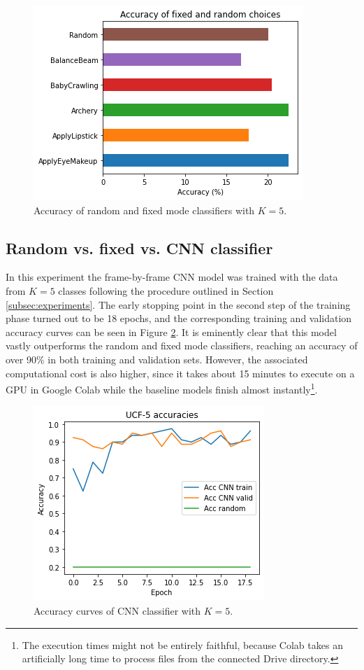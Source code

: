 \documentclass[letterpaper, 10 pt, conference]{IEEEtran}
\begin{document}
\begin{figure}[h!]
  \centering
  \includegraphics[width=.4\textwidth]{img/s1_accs}
  \vspace{-.5em}
  \caption{Accuracy of random and fixed mode classifiers with $K=5$.}
  \label{fig:comp_s1}
\end{figure}

\subsection{Random vs. fixed vs. CNN classifier}

In this experiment the frame-by-frame CNN model was trained with the data from $K=5$ classes following the procedure outlined in Section \ref{subsec:experiments}. The early stopping point in the second step of the training phase turned out to be 18 epochs, and the corresponding training and validation accuracy curves can be seen in Figure \ref{fig:acc5}. It is eminently clear that this model vastly outperforms the random and fixed mode classifiers, reaching an accuracy of over 90\% in both training and validation sets. However, the associated computational cost is also higher, since it takes about 15 minutes to execute on a GPU in Google Colab while the baseline models finish almost instantly\footnote{The execution times might not be entirely faithful, because Colab takes an artificially long time to process files from the connected Drive directory.}.

\begin{figure}[t]
  \centering
  \includegraphics[width=.35\textwidth]{img/ucf5-acc}
  \vspace{-.5em}
  \caption{Accuracy curves of CNN classifier with $K=5$.}
  \label{fig:acc5}
\end{figure}
\end{document}
